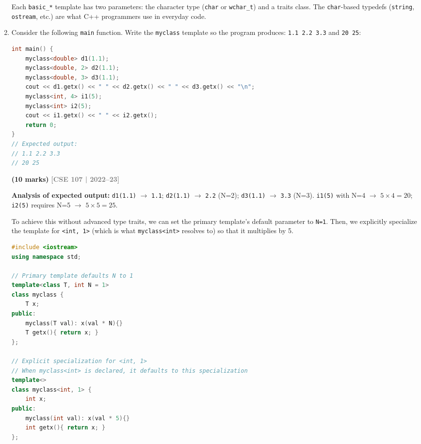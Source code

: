 \documentclass[12pt,a3paper]{article}
\newcommand{\yr}[1]{\hfill\textcolor{gray}{\small\textbf{[#1]}}}
\newcommand{\mk}[1]{\textcolor{orange!70!black}{\small\textbf{(#1 marks)}}}
\begin{document}
\begin{enumerate}
\begin{tcolorbox}
Each \texttt{basic\_*} template has two parameters: the character
type (\texttt{char} or \texttt{wchar\_t}) and a traits class.
The \texttt{char}-based typedefs (\texttt{string}, \texttt{ostream},
etc.) are what C++ programmers use in everyday code.

\end{tcolorbox}


\item Consider the following \texttt{main} function. Write the \texttt{myclass} template so the program produces: \texttt{1.1 2.2 3.3} and \texttt{20 25}:
\begin{lstlisting}[language=C++]
int main() {
    myclass<double> d1(1.1);
    myclass<double, 2> d2(1.1);
    myclass<double, 3> d3(1.1);
    cout << d1.getx() << " " << d2.getx() << " " << d3.getx() << "\n";
    myclass<int, 4> i1(5);
    myclass<int> i2(5);
    cout << i1.getx() << " " << i2.getx();
    return 0;
}
// Expected output:
// 1.1 2.2 3.3
// 20 25
\end{lstlisting}
\mk{10}
\yr{CSE 107 | 2022--23}
\begin{tcolorbox}[enhanced,breakable,ansbox,colback=cH!4,colframe=cH,
  boxrule=0.8pt,arc=5pt,
  title={\textbf{Answer --- myclass template using Explicit Specialization}},
  fonttitle=\bfseries\color{white},colbacktitle=cH]

\textbf{Analysis of expected output:}
\texttt{d1(1.1)} $\to$ \texttt{1.1}; \texttt{d2(1.1)} $\to$ \texttt{2.2} (N=2); \texttt{d3(1.1)} $\to$ \texttt{3.3} (N=3).
\texttt{i1(5)} with N=4 $\to$ $5\times4=20$; \texttt{i2(5)} requires N=5 $\to$ $5\times5=25$.

To achieve this without advanced type traits, we can set the primary template's default parameter to \texttt{N=1}. Then, we explicitly specialize the template for \texttt{<int, 1>} (which is what \texttt{myclass<int>} resolves to) so that it multiplies by 5.

\begin{lstlisting}[language=C++]
#include <iostream>
using namespace std;

// Primary template defaults N to 1
template<class T, int N = 1>
class myclass {
    T x;
public:
    myclass(T val): x(val * N){}
    T getx(){ return x; }
};

// Explicit specialization for <int, 1>
// When myclass<int> is declared, it defaults to this specialization
template<>
class myclass<int, 1> {
    int x;
public:
    myclass(int val): x(val * 5){}
    int getx(){ return x; }
};


\end{lstlisting}
\end{tcolorbox}
\end{enumerate}
\end{document}

